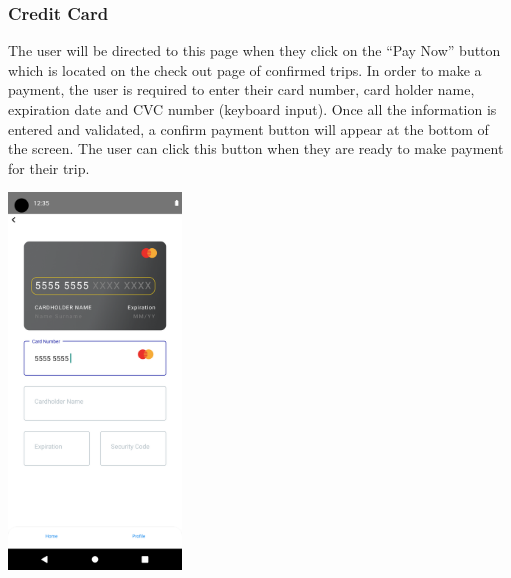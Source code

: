 \documentclass[hidelinks, 12pt, a4paper]{article}
\begin{document}
\subsubsection{Credit Card}
The user will be directed to this page when they click on the “Pay Now” button which is located on the check out page of confirmed trips. In order to make a payment, the user is required to enter their card number, card holder name, expiration date and CVC number (keyboard input). Once all the information is entered and validated, a confirm payment button will appear at the bottom of the screen. The user can click this button when they are ready to make payment for their trip.
\begin{center}
  \includegraphics[height=10cm]{images/credit-card.png}
\end{center}
\vspace{1cm}
\end{document}
